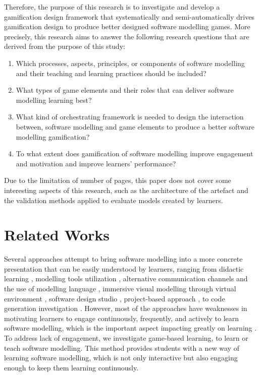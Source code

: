 \documentclass[runningheads,a4paper]{llncs}
\begin{document}
Therefore, the purpose of this research is to investigate and develop a gamification design framework that systematically and semi-automatically drives gamification design to produce better designed software modelling games. More precisely, this research aims to answer the following research questions that are derived from the purpose of this study:
\begin{enumerate}
\item Which processes, aspects, principles, or components of software modelling and their teaching and learning practices should be included?
\item What types of game elements and their roles that can deliver software modelling learning best? 
\item What kind of orchestrating framework is needed to design the interaction between, software modelling and game elements to produce a better software modelling gamification?
\item To what extent does gamification of software modelling improve engagement and motivation and improve learners’ performance?
\end{enumerate}

Due to the limitation of number of pages, this paper does not cover some interesting aspects of this research, such as the architecture of the artefact and the validation methods applied to evaluate models created by learners. 

\section{Related Works}
Several approaches attempt to bring software modelling into a more concrete presentation that can be easily understood by learners, ranging from didactic learning \cite{moisan2009teaching}, modelling tools utilization \cite{Akayama2013}, alternative communication channels and the use of modelling language \cite{Brandsteidl2011}, immersive visual modelling through virtual environment \cite{neubauer2003immersive}, software design studio \cite{Whittle2014}, project-based approach \cite{Szmurlo2007}, to code generation investigation \cite{schmidt2014teaching}. However, most of the approaches have weaknesses in motivating learners to engage continuously, frequently, and actively to learn software modelling, which is the important aspect impacting greatly on learning \cite{Naps2005}. To address lack of engagement, we investigate game-based learning, to learn or teach software modelling. This method provides students with a new way of learning software modelling, which is not only interactive but also engaging enough to keep them learning continuously. 
\end{document}
